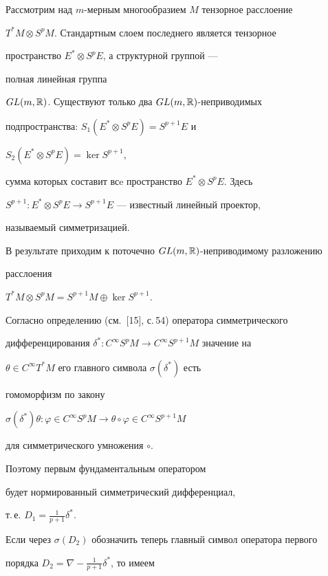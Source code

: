 \begin{pf}


Рассмотрим над $m$-мерным многообразием $M$ тензорное расслоение


$T^*M \otimes S^pM$. Стандартным слоем последнего является тензорное


пространство $E^* \otimes S^pE$, а структурной группой ---


полная линейная группа


$GL(m,\Bbb R)$. Существуют только два $GL(m,\Bbb R)$-неприводимых


подпространства: $S_1(E^* \otimes S^pE)=S^{p+1}E$ и


$S_2(E^* \otimes S^pE)=\ker S^{p+1}$,


сумма которых составит всe пространство $E^* \otimes S^pE$. Здесь


$S^{p+1}:E^*\otimes S^p E\to S^{p+1}E$ --- известный линейный проектор,


называемый симметризацией.





В результате приходим к поточечно $GL(m,\Bbb R)$-неприводимому разложению


расслоения


$T^*M \otimes S^pM=S^{p+1}M \oplus \ker S^{p+1}$.


Согласно определению (см.~[15], с.\,54) оператора симметрического


дифференцирования $\delta^*:C^\infty S^pM \to C^\infty S^{p+1}M$ значение на


$\theta \in C^\infty T^*M$ его главного символа $\sigma(\delta^*)$ есть


гомоморфизм по закону


$\sigma(\delta^*)\theta : \varphi \in C^\infty S^p M \to \theta \circ


\varphi \in C^\infty S^{p+1}M$


для симметрического умножения $\circ$. 


Поэтому первым фундаментальным оператором


будет нормированный симметрический дифференциал,


т.\,е. $D_1=\frac{1}{p+1}\delta^*$.





Если через $\sigma(D_2)$ обозначить теперь главный символ оператора первого


порядка $D_2=\nabla -\frac{1}{p+1}\delta^*$, то имеем



\end{pf}
